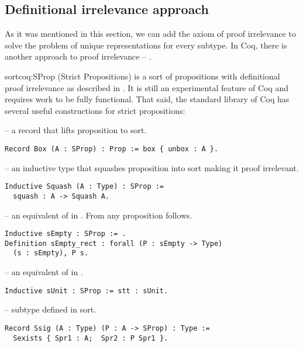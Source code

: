 \subsection{Definitional irrelevance approach}
As it was mentioned in this section, we can add the axiom of proof irrelevance to solve the problem of unique representations for every subtype. In Coq, there is another approach to proof irrelevance -- .
\begin{coq}[]{ sort}{coq:SProp}
 (Strict Propositions) is a sort of propositions with definitional proof irrelevance as described in \cite{BasesOfSProp}. It is still an experimental feature \cite{coqDoc} of Coq and requires work to be fully functional. That said, the standard library of Coq has several useful constructions for strict propositions:
\begin{description}
    \item {} -- a record that lifts  proposition to  sort.
    \begin{verbatim}
Record Box (A : SProp) : Prop := box { unbox : A }.
    \end{verbatim}
    \item {} -- an inductive type that squashes proposition into  sort making it proof irrelevant.
    \begin{verbatim}
Inductive Squash (A : Type) : SProp :=  
  squash : A -> Squash A.
    \end{verbatim}
    \item {} -- an equivalent of  in . From  any proposition follows.
    \begin{verbatim}
Inductive sEmpty : SProp := .
Definition sEmpty_rect : forall (P : sEmpty -> Type) 
  (s : sEmpty), P s.
    \end{verbatim}
    \pagebreak
    \item {} -- an equivalent of  in .
    \begin{verbatim}
Inductive sUnit : SProp := stt : sUnit.
    \end{verbatim}
    \item {} -- subtype defined in  sort.
    \begin{verbatim}
Record Ssig (A : Type) (P : A -> SProp) : Type :=
  Sexists { Spr1 : A;  Spr2 : P Spr1 }.
    \end{verbatim}
\end{description}
\end{coq}
